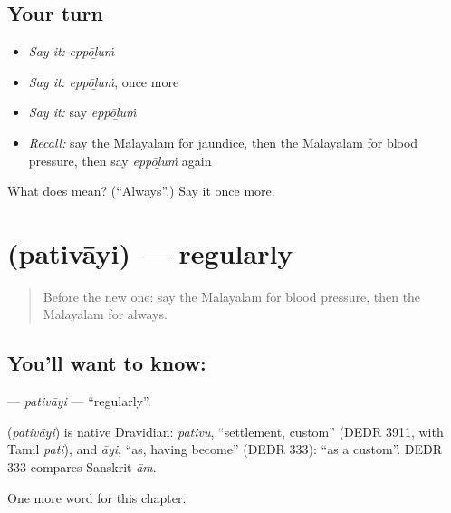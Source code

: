 \subsection*{Your turn}
\begin{itemize}
\raggedright
  \item \emph{Say it:} \emph{eppōḻuṁ}
  \item \emph{Say it:} \emph{eppōḻuṁ}, once more
  \item \emph{Say it:} say \emph{eppōḻuṁ}
  \item \emph{Recall:} say the Malayalam for jaundice, then the Malayalam for blood pressure, then say \emph{eppōḻuṁ} again
\end{itemize}

\begin{tcolorbox}[breakable,colback=teal!4,colframe=teal!35!black,title={Before you move on}]
What does  mean? (\textquotedblleft{}Always\textquotedblright{}.) Say it once more.
\end{tcolorbox}
\section[\texorpdfstring{\ml{പതിവായി} (pativāyi)}{പതിവായി (pativāyi)}]{ (pativāyi) — regularly}

\label{lesson:ML-C276-pativayi}



\begin{quote}
Before the new one: say the Malayalam for blood pressure, then the Malayalam for always.
\end{quote}

\subsection*{You'll want to know: }
\textbf{} — \emph{pativāyi} — \textquotedblleft{}regularly\textquotedblright{}.

\begin{cousinweb}
\textbf{} (\emph{pativāyi}) is native Dravidian: \emph{pativu}, \textquotedblleft{}settlement, custom\textquotedblright{} (DEDR 3911, with Tamil \emph{pati}), and \emph{āyi}, \textquotedblleft{}as, having become\textquotedblright{} (DEDR 333): \textquotedblleft{}as a custom\textquotedblright{}. DEDR 333 compares Sanskrit \emph{ām}.
\end{cousinweb}

\begin{grammarlens}[title={What you've built}]
One more word for this chapter.
\end{grammarlens}


